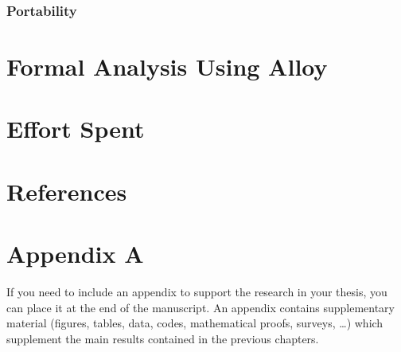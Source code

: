 \documentclass{/D:/Users/corsair-dragon/Documents/Github - Mario/CelaCelaCogollo/RASD/LaTeXCode/src/Configuration_Files/PoliMi3i_thesis.cls}
\begin{document}
    \subsection{Portability}\label{subsec:portability}


    \chapter{Formal Analysis Using Alloy}\label{ch:formal_analysis_using_alloy}


    \chapter{Effort Spent}\label{ch:effort_spent}


    \chapter{References}\label{ch:references}



    \cleardoublepage
    \appendix


    \chapter{Appendix A}\label{ch:appendix_a}
    If you need to include an appendix to support the research in your thesis, you can place it at the end of the manuscript.
    An appendix contains supplementary material (figures, tables, data, codes, mathematical proofs, surveys, \dots)
    which supplement the main results contained in the previous chapters.


    \listoffigures

    \listoftables

    \cleardoublepage
\end{document}
